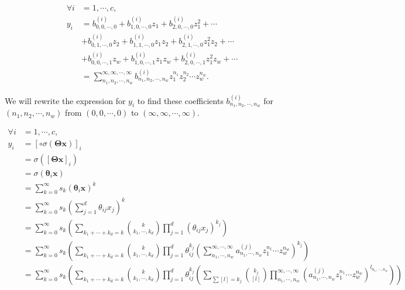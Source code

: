 \begin{align*}
    \forall i &= 1, \cdots, c, \\ y_i
    &= b^{(i)}_{0,0,\cdots,0} + b^{(i)}_{1,0,\cdots,0} z_1 + b^{(i)}_{2,0,\cdots,0} z_1^2 + \cdots \\
    &+ b^{(i)}_{0,1,\cdots,0} z_2 + b^{(i)}_{1,1,\cdots,0} z_1 z_2 + b^{(i)}_{2,1,\cdots,0} z_1^2 z_2 + \cdots \\
    &+ b^{(i)}_{0,0,\cdots,1} z_w + b^{(i)}_{1,0,\cdots,1} z_1 z_w + b^{(i)}_{2,0,\cdots,1} z_1^2 z_w + \cdots \\
    &= \sum_{n_1,n_2,\cdots,n_w}^{\infty,\infty,\cdots,\infty} b^{(i)}_{n_1,n_2,\cdots,n_w} z_1^{n_1} z_2^{n_2} \cdots z_w^{n_w}.
\end{align*}

We will rewrite the expression for $y_i$ to find these coefficients $b^{(i)}_{n_1, n_2, \cdots, n_w}$ for $(n_1, n_2, \cdots, n_w)$ from $(0, 0, \cdots, 0)$ to $(\infty, \infty, \cdots, \infty)$.

\begin{align*}
    \forall i &= 1, \cdots, c, \\ y_i
    &= \left[\circ\sigma(\mathbf{\Theta} \mathbf{x})\right]_i \\
    &= \sigma(\left[\mathbf{\Theta} \mathbf{x}\right]_i) \\
    &= \sigma(\mathbf{\theta}_i \mathbf{x}) \\
    &= \sum_{k=0}^{\infty} s_k (\mathbf{\theta}_i \mathbf{x})^k \\
    &= \sum_{k=0}^{\infty} s_k \left(\sum_{j=1}^{d} \theta_{ij} x_{j}\right)^k \\
    &= \sum_{k=0}^{\infty} s_k \left(\sum_{k_1 + \cdots + k_d = k} \binom{k}{k_1, \cdots, k_d} \prod_{j=1}^{d} (\theta_{ij} x_j)^{k_j} \right) \\
    &= \sum_{k=0}^{\infty} s_k \left(\sum_{k_1 + \cdots + k_d = k} \binom{k}{k_1, \cdots, k_d} \prod_{j=1}^{d}\theta_{ij}^{k_j} \left(\sum_{n_1, \cdots, n_w}^{\infty,
    \cdots, \infty} a^{(j)}_{n_1,\cdots,n_w} z_1^{n_1}  \cdots z_w^{n_w} \right)^{k_j}\right) \\
    &= \sum_{k=0}^{\infty} s_k \left(\sum_{k_1 + \cdots + k_d = k} \binom{k}{k_1, \cdots, k_d} \prod_{j=1}^{d} \theta_{ij}^{k_j} \left(\sum_{\sum [l] = k_j} \binom{k_j}{[l]} \prod_{n_1, \cdots, n_w}^{\infty, \cdots, \infty} (a^{(j)}_{n_1, \cdots, n_w} z_1^{n_1} \cdots z_w^{n_w})^{l_{n_1, \cdots, n_w}} \right)\right)
\end{align*}

